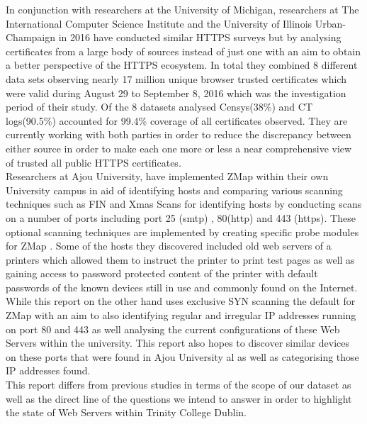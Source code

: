 \documentclass[a4wide,leqno,12pt]{report}
\begin{document}
In conjunction with researchers at the University of Michigan, researchers at The International Computer Science Institute and the University of Illinois Urban-Champaign in 2016 have conducted similar HTTPS surveys but by analysing certificates from a large body of sources instead of just one with an aim to obtain a better perspective of the HTTPS ecosystem. In total they combined 8 different data sets observing nearly 17 million unique browser trusted certificates which were valid during August 29 to September 8, 2016 which was the investigation period of their study. Of the 8 datasets analysed Censys(38\%) and CT logs(90.5\%) accounted for 99.4\% coverage of all certificates observed. They are currently working with both parties in order to reduce the discrepancy between either source in order to make each one more or less a near comprehensive view of trusted all public HTTPS certificates\cite{vandersloot2016towards}.\\

Researchers at Ajou University, have  implemented ZMap within their own University campus in aid of identifying hosts and comparing various scanning techniques such as FIN \cite{arkin1999network} and Xmas Scans \cite{arkin1999network}for identifying hosts by conducting scans on a number of ports including port 25 (smtp) , 80(http) and 443 (https). These optional scanning techniques are implemented by creating specific probe modules for ZMap \cite{lee2016implementation}. Some of the hosts they discovered included old web servers of a printers which allowed them to instruct the printer to print test pages as well as gaining access to password protected content of the printer with default passwords of the known devices still in use and commonly found on the Internet. While this report on the other hand uses exclusive SYN scanning \cite{de1999review} the default for ZMap with an aim to also identifying regular and irregular IP addresses running on port 80 and 443 as well analysing the current configurations of these Web Servers within the university. This report also hopes to discover similar devices on these ports that were found in Ajou University al as well as categorising those IP addresses found.\\

This report differs from previous studies in terms of the scope of our dataset as well as the direct line of the questions we intend to answer in order to highlight the state of Web Servers within Trinity College Dublin. \\
\end{document}
